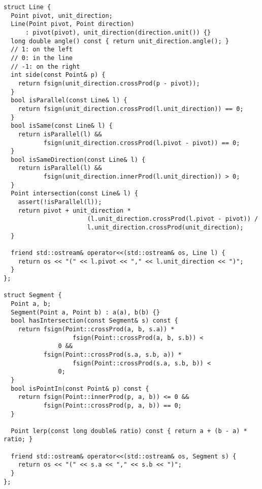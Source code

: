 \documentclass{article}
\begin{document}
\begin{multicols}{2}
\begin{lstlisting}
struct Line {
  Point pivot, unit_direction;
  Line(Point pivot, Point direction)
      : pivot(pivot), unit_direction(direction.unit()) {}
  long double angle() const { return unit_direction.angle(); }
  // 1: on the left
  // 0: in the line
  // -1: on the right
  int side(const Point& p) {
    return fsign(unit_direction.crossProd(p - pivot));
  }
  bool isParallel(const Line& l) {
    return fsign(unit_direction.crossProd(l.unit_direction)) == 0;
  }
  bool isSame(const Line& l) {
    return isParallel(l) &&
           fsign(unit_direction.crossProd(l.pivot - pivot)) == 0;
  }
  bool isSameDirection(const Line& l) {
    return isParallel(l) &&
           fsign(unit_direction.innerProd(l.unit_direction)) > 0;
  }
  Point intersection(const Line& l) {
    assert(!isParallel(l));
    return pivot + unit_direction *
                       (l.unit_direction.crossProd(l.pivot - pivot)) /
                       l.unit_direction.crossProd(unit_direction);
  }

  friend std::ostream& operator<<(std::ostream& os, Line l) {
    return os << "(" << l.pivot << "," << l.unit_direction << ")";
  }
};

struct Segment {
  Point a, b;
  Segment(Point a, Point b) : a(a), b(b) {}
  bool hasIntersection(const Segment& s) const {
    return fsign(Point::crossProd(a, b, s.a)) *
                   fsign(Point::crossProd(a, b, s.b)) <
               0 &&
           fsign(Point::crossProd(s.a, s.b, a)) *
                   fsign(Point::crossProd(s.a, s.b, b)) <
               0;
  }
  bool isPointIn(const Point& p) const {
    return fsign(Point::innerProd(p, a, b)) <= 0 &&
           fsign(Point::crossProd(p, a, b)) == 0;
  }

  Point lerp(const long double& ratio) const { return a + (b - a) * ratio; }

  friend std::ostream& operator<<(std::ostream& os, Segment s) {
    return os << "(" << s.a << "," << s.b << ")";
  }
};


\end{lstlisting}
\end{multicols}
\end{document}
